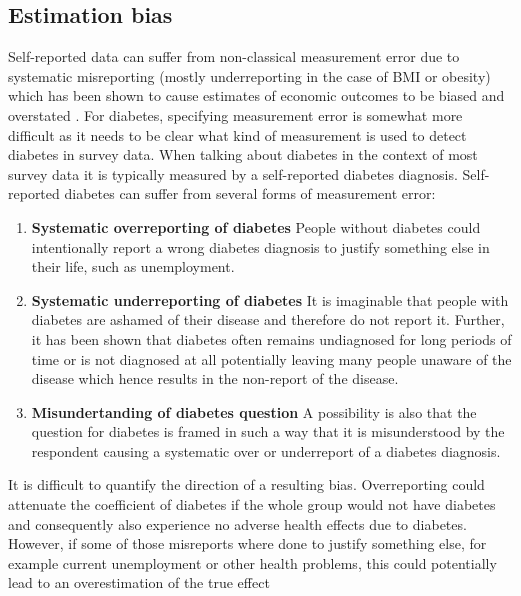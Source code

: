 \subsection{Estimation bias}

Self-reported data can suffer from non-classical measurement
error due to systematic misreporting (mostly underreporting in the
case of \ac{BMI} or obesity) which has been shown to cause estimates
of economic outcomes to be biased and overstated \citep{Cawley2015,ONeill2013,Perks2015}.
For diabetes, specifying measurement error is somewhat more difficult
as it needs to be clear what kind of measurement is used to detect
diabetes in survey data.
When talking about diabetes in the context of most survey data it
is typically measured by a self-reported diabetes diagnosis. Self-reported diabetes can suffer from several forms of measurement error:
\begin{enumerate}
\item \textbf{Systematic overreporting of diabetes}
People without diabetes could intentionally report a wrong diabetes diagnosis to justify something else in their life, such as unemployment.
\item \textbf{Systematic underreporting of diabetes}
It is imaginable that people with diabetes are ashamed of their disease and therefore do not report it. Further, it has been shown that diabetes often remains undiagnosed for long periods of time or is not diagnosed at all potentially leaving many people unaware of the disease which hence results in the non-report of the disease.
\item \textbf{Misundertanding of diabetes question}
A possibility is also that the question for diabetes is framed in such a way that it is misunderstood by the respondent causing a systematic over or underreport of a diabetes diagnosis. 
\end{enumerate}
It is difficult to quantify the direction of a resulting bias. Overreporting could attenuate the coefficient of diabetes if the whole group would not have diabetes and
consequently also experience no adverse health effects due to diabetes.
However, if some of those misreports where done to
justify something else, for example current unemployment or other health problems,
this could potentially lead to an overestimation of the true effect
